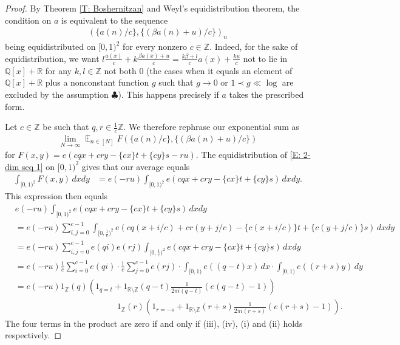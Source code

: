 \documentclass[11pt]{amsart}
\theoremstyle{definition}
\DeclareMathOperator*{\E}{\mathbb{E}}
\newcommand{\Q}{{\mathbb Q}}
\newcommand{\R}{{\mathbb R}}
\newcommand{\Z}{{\mathbb Z}}
\newcommand{\1}{{\mathbf{1}}}
\newcommand{\brac}[1]{\mathopen{}\left( #1 \mathclose{}\right)}
\begin{document}
\begin{proof}
By Theorem \ref{T: Boshernitzan} and Weyl's equidistribution theorem, the condition on $a$ is equivalent to the sequence
\begin{align}\label{E: 2-dim seq 1}
    (\{a(n)/c\}, \{(\beta a(n)+u)/c\})_n    
\end{align}
being equidistributed on $[0,1)^2$ for every nonzero $c\in\Z$. {Indeed, for the sake of equidistribution, we want $l\frac{a(x)}{c}+k\frac{\beta a(x)+u}{c} = \frac{k\beta + l}{c}a(x)+\frac{ku}{c}$ not to lie in $\Q[x]+\R$ for any $k,l\in\Z$ not both 0 (the cases when it equals an element of $\Q[x]+\R$ plus a nonconstant function $g$ such that $g\to 0$ or $1\prec g\ll \log$ are excluded by the assumption $\clubsuit$).}  This happens precisely if $a$ takes the prescribed form.

Let $c\in\Z$ be such that $q, r\in\frac{1}{c}\Z$.
We therefore rephrase our exponential sum as
 \begin{align*}
     \lim_{N\to\infty}\E_{n\in[N]} F(\{a(n)/c\}, \{(\beta a(n)+u)/c\})
 \end{align*}
 for $F(x,y) =  e(cq x+cr y-\{cx\}t +\{cy\}s-ru)$. The equidistribution of \eqref{E: 2-dim seq 1}
 on $[0,1)^2$ gives that our average equals
 \begin{align*}
      \int_{[0,1)^2}F(x,y)\, dx dy
     &= e(-ru)\int_{[0,1)^2}e(cqx+cr y-\{cx\}t +\{cy\}s)\, dx dy.
 \end{align*}
 This expression then equals
 \begin{equation*}
     \begin{split}
       & %
       e(-ru)\int_{[0,1)^2}e(cq x+ cry-\{cx\}t +\{cy\}s)\, dxdy
       \\&=e(-ru)\sum_{i,j=0}^{c-1}\int_{[0,\frac{1}{c})^2}e\brac{cq\brac{x+i/c}+cr\brac{y+j/c}-\{c\brac{x+i/c}\}t +\{c\brac{y+j/c}\}s}\, dxdy
       \\&=e(-ru)\sum_{i,j=0}^{c-1}e\brac{qi}e\brac{rj}\int_{[0,\frac{1}{c})^2}e(cqx + cry-\{cx\}t +\{cy\}s)\, dxdy
        \\&=e(-ru)\frac{1}{c}\sum_{i=0}^{c-1}e\brac{qi}\cdot \frac{1}{c}\sum_{j=0}^{c-1}e\brac{rj}\cdot \int_{[0,1)}e((q-t)x)\, dx\cdot\int_{[0,1)}e((r+s)y)\, dy\\
        &= e(-ru)1_\Z(q)  \brac{1_{q=t} + 1_{\R\setminus\Z}(q-t)\frac{1}{2\pi i(q-t)}(e(q-t)-1)}\\
        &\qquad\qquad\qquad\qquad\qquad\qquad 1_\Z(r)\brac{1_{r=-s} + 1_{\R\setminus\Z}(r+s)\frac{1}{2\pi i(r+s)}(e(r+s)-1)}.
     \end{split}
 \end{equation*}
 The four terms in the product are zero if and only if (iii), (iv), (i) and (ii) holds respectively.
\end{proof}
\end{document}
